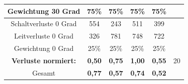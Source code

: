 \begin{table}
\begin{tabular}{|c|c|c|c|c|c|}
	\hline
	Gewichtung 30 Grad & 75\% & 75\% & 75\% & 75\% &\\
	\hline
	Schaltverluste 0 Grad & 554 & 243 & 511 & 399& \\
	\hline
	Leitverluste 0 Grad & 326 & 781 & 748 & 722&\\
	\hline
	Gewichtung 0 Grad & 25\% & 25\% & 25\% & 25\%& \\
	\hline
	\bfseries Verluste normiert: &\bfseries 0,50 &\bfseries 0,75 &\bfseries 1,00 &\bfseries 0,55 &20\\
	\hline
	Gesamt &\bfseries 0,77 &\bfseries 0,57 &\bfseries 0,74 &\bfseries 0,52 & \\
	\hline
\end{tabular}
	\label{An:Entscheidungsmatrix}
\end{table}




